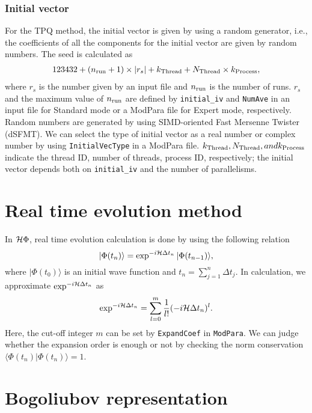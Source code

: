 \subsubsection*{Initial vector}
For the TPQ method, the initial vector is given by using a random generator, i.e., the coefficients of all the components for the initial vector are given by random numbers. The seed is calculated as 
\begin{align}
123432+(n_{\rm run}+1)\times  |r_s|+k_{\rm Thread}+N_{\rm Thread} \times k_{\rm Process},
\end{align}
where $r_s$ is the number given by an input file and $n_{\rm run}$ is the number of runs. $r_s$ and the maximum value of $n_{\rm run}$ are defined by \verb|initial_iv| and \verb|NumAve| in an input file for Standard mode or a ModPara file for Expert mode, respectively. Random numbers are generated by using SIMD-oriented Fast Mersenne Twister (dSFMT)\cite{Mutsuo2008}. We can select the type of initial vector as a real number or complex number by using \verb|InitialVecType| in a ModPara file.
$k_{\rm Thread}, N_{\rm Thread}, and k_{\rm Process}$ indicate 
the thread ID, number of threads, process ID, respectively;
the initial vector depends both on \verb|initial_iv| and the number of parallelisms.

\section{{Real time evolution method}}
\label{Ch:TE}
In ${\cal H}\Phi$, real time evolution calculation is done by using the following relation
\begin{equation}
|\Phi (t_n)\rangle = \exp^{-i {\cal H}  \Delta t_n}|\Phi (t_{n-1})\rangle,
\end{equation}
where $|\Phi(t_0)\rangle$ is an initial wave function and $t_n = \sum_{j=1}^n  \Delta t_j $.
In calculation, we approximate $\exp^{-i {\cal H}  \Delta t_n}$ as
\begin{equation}
\exp^{-i {\cal H}  \Delta t_n} =\sum_{l=0}^m \frac{1}{l!}(-i {\cal H}  \Delta t_n)^l .
\end{equation}
Here, the cut-off integer $m$ can be set by \verb|ExpandCoef| in \verb|ModPara|.
We can judge whether the expansion order is enough or not by checking the norm conservation $\langle \Phi (t_n)|\Phi (t_n)\rangle=1$.

\section{Bogoliubov representation}\label{sec_bogoliubov_rep}

